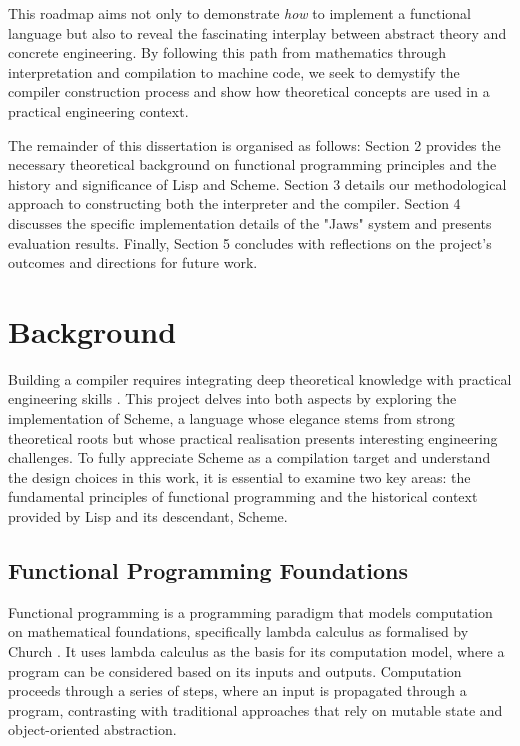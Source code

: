 \documentclass[final]{cmpreport_02}
\begin{document}
This roadmap aims not only to demonstrate \emph{how} to implement a functional language but also to reveal the fascinating interplay between abstract theory and concrete engineering. By following this path from mathematics through interpretation and compilation to machine code, we seek to demystify the compiler construction process and show how theoretical concepts are used in a practical engineering context.

The remainder of this dissertation is organised as follows: Section 2 provides the necessary theoretical background on functional programming principles and the history and significance of Lisp and Scheme. Section 3 details our methodological approach to constructing both the interpreter and the compiler. Section 4 discusses the specific implementation details of the "Jaws" system and presents evaluation results. Finally, Section 5 concludes with reflections on the project's outcomes and directions for future work.

\section{Background}

Building a compiler requires integrating deep theoretical knowledge with practical engineering skills \cite{cooper2011engineering}. This project delves into both aspects by exploring the implementation of Scheme, a language whose elegance stems from strong theoretical roots but whose practical realisation presents interesting engineering challenges. To fully appreciate Scheme as a compilation target and understand the design choices in this work, it is essential to examine two key areas: the fundamental principles of functional programming and the historical context provided by Lisp and its descendant, Scheme.

\subsection{Functional Programming Foundations}

Functional programming is a programming paradigm that models computation on mathematical foundations, specifically lambda calculus as formalised by Church \cite{church1936unsolvable}. It uses lambda calculus as the basis for its computation model, where a program can be considered based on its inputs and outputs. Computation proceeds through a series of steps, where an input is propagated through a program, contrasting with traditional approaches that rely on mutable state and object-oriented abstraction.
\end{document}
